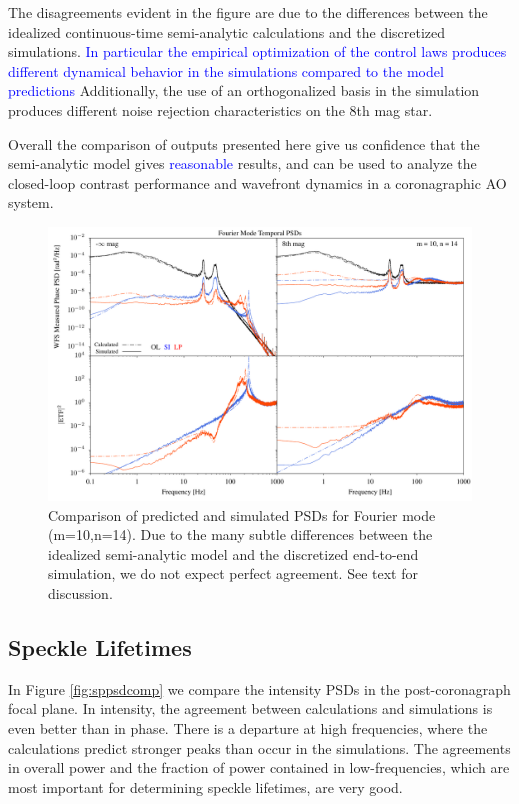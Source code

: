 \documentclass[10pt,preprint]{aastex631}
\newcommand{\jrmadd}[1]{\textcolor{blue}{#1}}
\begin{document}
The disagreements evident in the figure are due to the differences between the idealized continuous-time semi-analytic calculations and the discretized simulations. \jrmadd{In particular the empirical optimization of the control laws produces different dynamical behavior in the simulations compared to the model predictions} Additionally, the use of an orthogonalized basis in the simulation produces different noise rejection characteristics on the 8th mag star.  

Overall the comparison of outputs presented here give us confidence that the semi-analytic model gives \jrmadd{reasonable} results, and can be used to analyze the closed-loop contrast performance and wavefront dynamics in a coronagraphic AO system.

\begin{figure}
\hspace{-0.3in}
\includegraphics[width=6.5in]{psdcomp_10_14.pdf}
\caption{Comparison of predicted and simulated PSDs for Fourier mode (m=10,n=14).  Due to the many subtle differences between the idealized semi-analytic model and the discretized end-to-end simulation, we do not expect perfect agreement.  See text for discussion.    \label{fig:opd_psdcomp}}
\end{figure}


\subsection{Speckle Lifetimes}

In Figure \ref{fig:sppsdcomp} we compare the intensity PSDs in the post-coronagraph focal plane.  In intensity, the agreement between calculations and simulations is even better than in phase.  There is a departure at high frequencies, where the calculations predict stronger peaks than occur in the simulations. The agreements in overall power and the fraction of power contained in low-frequencies, which are most important for determining speckle lifetimes, are very good.
\end{document}
